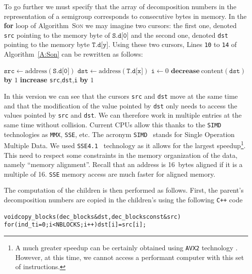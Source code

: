 \documentclass[reqno]{amsart}
\theoremstyle{plain}
\theoremstyle{definition}
\newcommand{\CPP}{\texttt{C++}\xspace}
\renewcommand{\leq}{\leqslant}
\newcommand{\MMX}{\texttt{MMX}\xspace}
\newcommand{\SIMD}{\texttt{SIMD}\xspace}
\newcommand{\SSE}{\texttt{SSE}\xspace}
\newcommand{\SSEV}{\texttt{SSE4.1}\xspace}
\renewcommand{\tt}[1]{\texttt{#1}}
\begin{document}
To go further we must specify that the array of decomposition numbers in the
representation of a semigroup corresponds to consecutive bytes in memory. In
the \textbf{for} loop of Algorithm~\textsc{Son} we may imagine two cursors:
the first one, denoted \texttt{src} pointing to the memory byte of
$\texttt{S.d[0]}$ and the second one, denoted \texttt{dst} pointing to the
memory byte $\texttt{T.d[y]}$.  Using these two cursors, Lines \tt{10} to
\tt{14} of Algorithm~\ref{A:Son} can be rewritten as follows:

\vspace{1em}
\small
\begin{algorithmic}
\State $\tt{src}\gets \text{address}(\tt{S.d[0]})$
\State $\tt{dst}\gets \text{address}(\tt{T.d[x]})$
\State $\tt{i}\gets 0$
\While{$\tt{i}\leq \tt{3G}-\tt{x}$}
\If{$\text{content}(\tt{src})>0$}
\State $\textbf{decrease}\ \text{content}(\tt{dst})$ \textbf{by} $1$\EndIf
\State \textbf{increase} \tt{src},\tt{dst},\tt{i} \textbf{by} $1$
\EndWhile
\end{algorithmic}
\vspace{1em}

\noindent In this version we can see that the cursors \texttt{src} and
\texttt{dst} move at the same time and that the modification of the value
pointed by \texttt{dst} only needs to access the values pointed by \tt{src}
and \tt{dst}.  We can therefore work in multiple entries at the same time
without collision.  Current CPUs allow this thanks to the \SIMD technologies as
\MMX, \SSE, etc.  The acronym \SIMD~\cite{WikipediaSIMD} stands for Single Operation Multiple Data.  
We used \SSEV~\cite{WikipediaSSE, IntelSSE} technology as it allows for the largest speedup\footnote{A much greater  speedup can be certainly obtained using \texttt{AVX2} technology \cite{AVX2}. However, at this time, we cannot access a performant computer with this set of instructions.}.  
This need to respect some constraints in the memory
organization of the data, namely ``memory alignment''. Recall that an address
is 16~bytes aligned if it is a multiple of 16. \SSE memory access are much
faster for aligned memory.


The computation of the children is then performed as follows. First, the
parent's decomposition numbers are copied in the children's using the
following \CPP code
{
\small
\begin{alltt}
void copy_blocks(dec_blocks &dst, dec_blocks const &src) {
  for (ind_t i=0; i<NBLOCKS; i++) dst[i] = src[i];
}
\end{alltt}}
\end{document}

